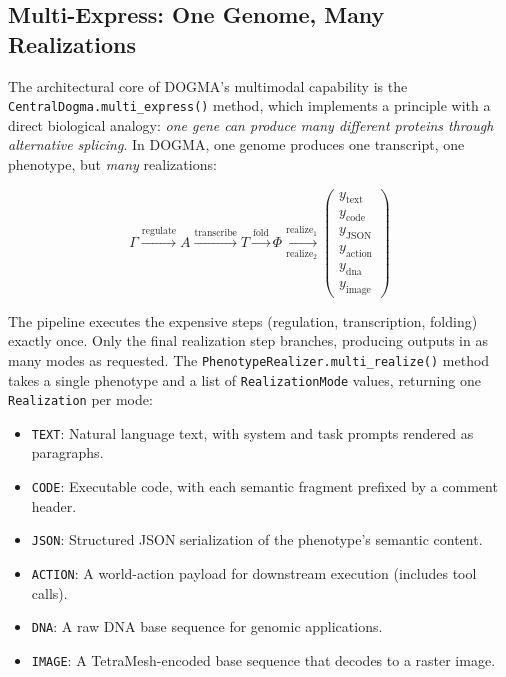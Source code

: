 \subsection{Multi-Express: One Genome, Many Realizations}
\label{sec:multi-express}

The architectural core of DOGMA's multimodal capability is the \texttt{CentralDogma.multi\_express()} method, which implements a principle with a direct biological analogy: \emph{one gene can produce many different proteins through alternative splicing}. In DOGMA, one genome produces one transcript, one phenotype, but \emph{many} realizations:

\begin{equation}
\boxed{
\Gamma \xrightarrow{\text{regulate}} A \xrightarrow{\text{transcribe}} T \xrightarrow{\text{fold}} \Phi \xrightarrow[\text{realize}_2]{\text{realize}_1} \begin{pmatrix} y_{\text{text}} \\ y_{\text{code}} \\ y_{\text{JSON}} \\ y_{\text{action}} \\ y_{\text{dna}} \\ y_{\text{image}} \end{pmatrix}
}
\label{eq:multi-express}
\end{equation}

The pipeline executes the expensive steps (regulation, transcription, folding) exactly once. Only the final realization step branches, producing outputs in as many modes as requested. The \texttt{PhenotypeRealizer.multi\_realize()} method takes a single phenotype and a list of \texttt{RealizationMode} values, returning one \texttt{Realization} per mode:

\begin{itemize}[leftmargin=1.5em]
  \item \texttt{TEXT}: Natural language text, with system and task prompts rendered as paragraphs.
  \item \texttt{CODE}: Executable code, with each semantic fragment prefixed by a comment header.
  \item \texttt{JSON}: Structured JSON serialization of the phenotype's semantic content.
  \item \texttt{ACTION}: A world-action payload for downstream execution (includes tool calls).
  \item \texttt{DNA}: A raw DNA base sequence for genomic applications.
  \item \texttt{IMAGE}: A TetraMesh-encoded base sequence that decodes to a raster image.
\end{itemize}

